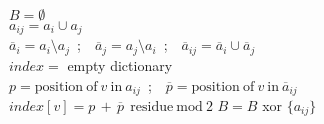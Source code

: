 \begin{algorithm} [H]
	$B = \emptyset$\\
	{	
		$a_{ij} = a_i \cup a_j$\\
		{
			$\overline{a}_i = a_i \setminus a_j$\ ;\ \ 
			$\overline{a}_j = a_j \setminus a_i$\ ;\ \
			$\overline{a}_{ij} = \overline{a}_i \cup \overline{a}_j$ \\
			$index =$ empty dictionary\\
			\ForAll {$v \in \overline{a}_{ij}$}
			{
				$p = \mathrm{position\ of\ } v \mathrm{\ in\ } a_{ij}$\ ;\ \
				$\overline{p} = \mathrm{position\ of\ } v \mathrm{\ in\ } \overline{a}_{ij}$\\
				$index[v] = {p}\, +\, \overline{p}\ \ \mathrm{residue\ mod}\ 2$
			}
				{$B = B$ xor $\{a_{ij}\}$}
		}		
	}
	\caption{$SQ^k$}
\end{algorithm}